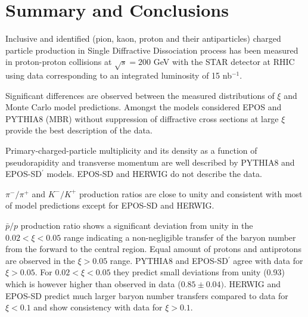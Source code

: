 \chapter{Summary and Conclusions}\label{chapter:summary}

Inclusive and identified (pion, kaon, proton and their antiparticles) charged particle production in Single Diffractive Dissociation process has been measured in proton-proton collisions at $\sqrt{s}= 200$ GeV with the STAR detector at RHIC using data corresponding to an integrated luminosity of 15 nb$^{-1}$.

Significant differences are observed between the measured distributions of $\xi$ and Monte Carlo model predictions. Amongst the models considered EPOS and PYTHIA8 (MBR) without suppression of diffractive cross sections at large $\xi$ provide the best description of the data.

Primary-charged-particle multiplicity and its density as a function of pseudorapidity and transverse momentum are well described by PYTHIA8 and EPOS-SD$^\prime$ models.  EPOS-SD and HERWIG do not describe the data.

$\pi^-/\pi^+$ and $K^-/K^+$ production ratios are close to unity and consistent with most of model predictions except for EPOS-SD and HERWIG.

$\bar{p}/p$ production ratio shows a significant deviation from unity 
in the $0.02<\xi<0.05$ range indicating a non-negligible transfer of the baryon number from the forward to the central region. Equal amount of protons and antiprotons are observed in the $\xi>0.05$ range.
PYTHIA8 and EPOS-SD$^\prime$ agree with data for $\xi>0.05$. 
For $0.02<\xi<0.05$ they predict small deviations from unity (0.93) which is however higher than observed in data ($0.85\pm 0.04)$. 
HERWIG and EPOS-SD predict much larger baryon number transfers compared to data for $\xi<0.1$ and show consistency with data for $\xi>0.1$.